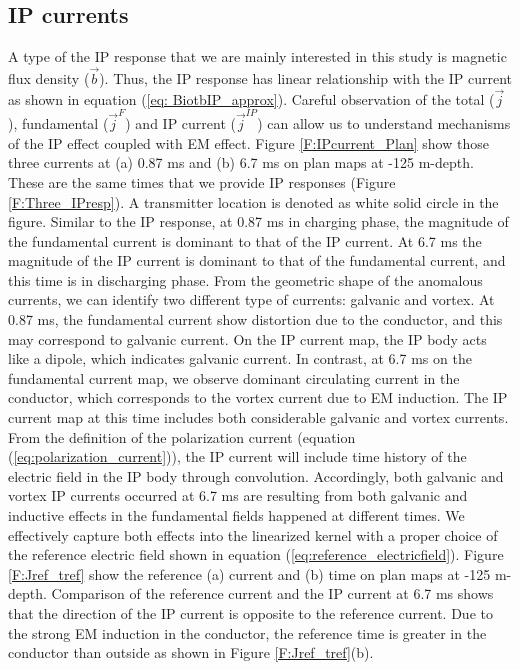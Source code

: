 \documentclass[a4paper, 11pt]{article}
\renewcommand {\j}  { {\vec j} }
\renewcommand {\b}  { {\vec b} }
\begin{document}
\subsection{IP currents}
A type of the IP response that we are mainly interested in this study is magnetic flux density ($\b$). 
Thus, the IP response has linear relationship with the IP current as shown in equation (\ref{eq: BiotbIP_approx}).
Careful observation of the total ($\j$), fundamental ($\j^F$) and IP current ($\j^{IP}$) can allow us to understand mechanisms of the IP effect coupled with EM effect. 
Figure \ref{F:IPcurrent_Plan} show those three currents at (a) 0.87 ms and (b) 6.7 ms on plan maps at -125 m-depth. These are the same times that we provide IP responses (Figure \ref{F:Three_IPresp}). 
A transmitter location is denoted as white solid circle in the figure. 
Similar to the IP response, at 0.87 ms in charging phase, the magnitude of the fundamental current is dominant to that of the IP current. 
At 6.7 ms the magnitude of the IP current is dominant to that of the fundamental current, and this time is in discharging phase. 
From the geometric shape of the anomalous currents, we can identify two different type of currents: galvanic and vortex. 
At 0.87 ms, the fundamental current show distortion due to the conductor, and this may correspond to galvanic current. 
On the IP current map, the IP body acts like a dipole, which indicates galvanic current. 
In contrast, at 6.7 ms on the fundamental current map, we observe dominant circulating current in the conductor, which corresponds to the vortex current due to EM induction. 
The IP current map at this time includes both considerable galvanic and vortex currents. 
From the definition of the polarization current (equation (\ref{eq:polarization_current})), the IP current will include time history of the electric field in the IP body through convolution. 
Accordingly, both galvanic and vortex IP currents occurred at 6.7 ms are resulting from both galvanic and inductive effects in the fundamental fields happened at different times. 
We effectively capture both effects into the linearized kernel with a proper choice of the reference electric field shown in equation (\ref{eq:reference_electricfield}). 
Figure \ref{F:Jref_tref} show the reference (a) current and (b) time on plan maps at -125 m-depth. 
Comparison of the reference current and the IP current at 6.7 ms shows that the direction of the IP current is opposite to the reference current. 
Due to the strong EM induction in the conductor, the reference time is greater in the conductor than outside as shown in Figure \ref{F:Jref_tref}(b). 
\end{document}
